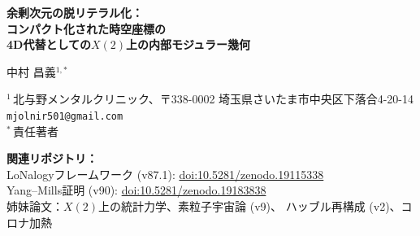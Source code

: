 \documentclass[12pt]{article}
\theoremstyle{plain}
\theoremstyle{definition}
\numberwithin{equation}{section}
\newcommand{\br}{\mathrm{br}}
\begin{document}
\begin{titlepage}
\centering
\vspace*{1cm}
{\LARGE\bfseries 余剰次元の脱リテラル化：\\[6pt]
コンパクト化された時空座標の\\[6pt]
4D代替としての$X(2)$上の内部モジュラー幾何}
\vspace{1.5cm}

{\large 中村 昌義$^{1,*}$}
\vspace{0.8cm}

{\normalsize
$^1$\,北与野メンタルクリニック、〒338-0002
埼玉県さいたま市中央区下落合4-20-14\\
\texttt{mjolnir501@gmail.com}\\[4pt]
$^*$\,責任著者
}
\vspace{0.8cm}

{\small
\noindent\textbf{関連リポジトリ：}\\
LoNalogyフレームワーク (v87.1):
\href{https://doi.org/10.5281/zenodo.19115338}{doi:10.5281/zenodo.19115338}\\
Yang--Mills証明 (v90):
\href{https://doi.org/10.5281/zenodo.19183838}{doi:10.5281/zenodo.19183838}\\
姉妹論文：$X(2)$上の統計力学、素粒子宇宙論 (v9)、
ハッブル再構成 (v2)、コロナ加熱
}
\vspace{1.0cm}

\begin{abstract}
\noindent
弦理論は量子重力の整合性のために余剰空間次元を要求する。
LHC（ADD重力子放出に対して
$M_D\gtrsim 5.5$--$11.2\,\mathrm{TeV}$、
RSカルツァ-クライン重力子に対して
$m_1\gtrsim 2.2$--$5.6\,\mathrm{TeV}$）
および短距離重力実験（$\delta=1$で$R<44\,\mu\mathrm{m}$）
による広範な探索にもかかわらず、
余剰次元の証拠は見つかっていない。

LoNalogyフレームワークではリテラルな余剰時空座標が不要であることを示す。
核心作用は4次元であり、弦理論で余剰次元が果たす役割——ゲージ統一、
世代構造、結合階層——は$X(2)$の内部モジュラー/ファイバー幾何が担う。
LoNalogyに現れる整数$\nu_{\br}=12$、$d_{\mathrm{fib}}=7$、$N=5$は
内部束の次元であり時空座標ではない。

結論：余剰次元は否定されるのではなく\emph{脱リテラル化}される。
4D法則の背後にある内部幾何として再解釈され、
これはワープ型余剰次元を4D複合ダイナミクスとして読む
主流のAdS/CFT的解釈と整合する。
\end{abstract}
\end{titlepage}

\setcounter{page}{1}
\tableofcontents
\newpage
\end{document}
